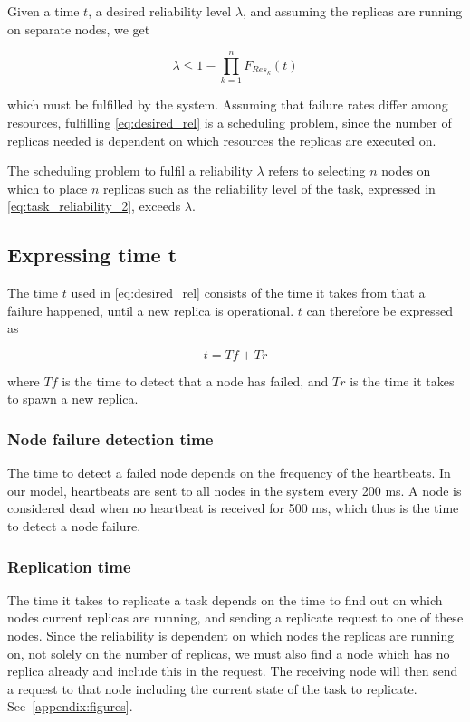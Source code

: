 \documentclass{cslthse-msc}
\begin{document}
Given a time $t$, a desired reliability level $\lambda$, and assuming the replicas are running on separate nodes, we get

\begin{equation} \label{eq:desired_rel}
\lambda \leq 1 - \prod\limits_{k=1}^n  F_{Res_k}(t)
\end{equation}

which must be fulfilled by the system. Assuming that failure rates differ among resources, fulfilling \autoref{eq:desired_rel} is a scheduling problem, since the number of replicas needed is dependent on which resources the replicas are executed on.

The scheduling problem to fulfil a reliability $\lambda$ refers to selecting $n$ nodes on which to place $n$ replicas such as the reliability level of the task, expressed in \autoref{eq:task_reliability_2}, exceeds $\lambda$.

\subsection{Expressing time t} \label{sec:design_time_t}
The time $t$ used in \autoref{eq:desired_rel} consists of the time it takes from that a failure happened, until a new replica is operational. $t$ can therefore be expressed as 

\begin{equation} \label{eq:rep_time}
	t = Tf + Tr
\end{equation}

where $Tf$ is the time to detect that a node has failed, and $Tr$ is the time it takes to spawn a new replica.

\subsubsection{Node failure detection time} \label{sec:node_failure_detection_time}
The time to detect a failed node depends on the frequency of the heartbeats. In our model, heartbeats are sent to all nodes in the system every 200 ms. A node is considered dead when no heartbeat is received for 500 ms, which thus is the time to detect a node failure.

\subsubsection{Replication time} \label{sec:replication_time}
The time it takes to replicate a task depends on the time to find out on which nodes current replicas are running, and sending a replicate request to one of these nodes. Since the reliability is dependent on which nodes the replicas are running on, not solely on the number of replicas, we must also find a node which has no replica already and include this in the request. The receiving node will then send a request to that node including the current state of the task to replicate. See~\autoref{appendix:figures}.
\end{document}
